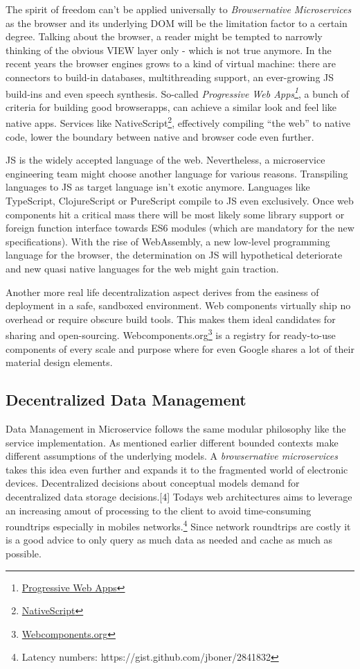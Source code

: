 \documentclass[]{article}
\begin{document}
The spirit of freedom can't be applied universally to
\emph{Browsernative Microservices} as the browser and its underlying DOM
will be the limitation factor to a certain degree. Talking about the
browser, a reader might be tempted to narrowly thinking of the obvious
VIEW layer only - which is not true anymore. In the recent years the
browser engines grows to a kind of virtual machine: there are connectors
to build-in databases, multithreading support, an ever-growing JS
build-ins and even speech synthesis. So-called \emph{Progressive Web
Apps\footnote{\href{https://developers.google.com/web/progressive-web-apps}{Progressive
  Web Apps}}}, a bunch of criteria for building good browserapps, can
achieve a similar look and feel like native apps. Services like
NativeScript\footnote{\href{https://www.nativescript.org}{NativeScript}},
effectively compiling ``the web'' to native code, lower the boundary
between native and browser code even further.

JS is the widely accepted language of the web. Nevertheless, a
microservice engineering team might choose another language for various
reasons. Transpiling languages to JS as target language isn't exotic
anymore. Languages like TypeScript, ClojureScript or PureScript compile
to JS even exclusively. Once web components hit a critical mass there
will be most likely some library support or foreign function interface
towards ES6 modules (which are mandatory for the new specifications).
With the rise of WebAssembly, a new low-level programming language for
the browser, the determination on JS will hypothetical deteriorate and
new quasi native languages for the web might gain traction.

Another more real life decentralization aspect derives from the easiness
of deployment in a safe, sandboxed environment. Web components virtually
ship no overhead or require obscure build tools. This makes them ideal
candidates for sharing and open-sourcing. Webcomponents.org\footnote{\href{https://webcomponents.org}{Webcomponents.org}}
is a registry for ready-to-use components of every scale and purpose
where for even Google shares a lot of their material design elements.

\subsection{Decentralized Data
Management}\label{decentralized-data-management}

Data Management in Microservice follows the same modular philosophy like
the service implementation. As mentioned earlier different bounded
contexts make different assumptions of the underlying models. A
\emph{browsernative microservices} takes this idea even further and
expands it to the fragmented world of electronic devices. Decentralized
decisions about conceptual models demand for decentralized data storage
decisions.{[}4{]} Todays web architectures aims to leverage an
increasing amout of processing to the client to avoid time-consuming
roundtrips especially in mobiles networks.\footnote{Latency numbers:
  https://gist.github.com/jboner/2841832} Since network roundtrips are
costly it is a good advice to only query as much data as needed and
cache as much as possible.
\end{document}
